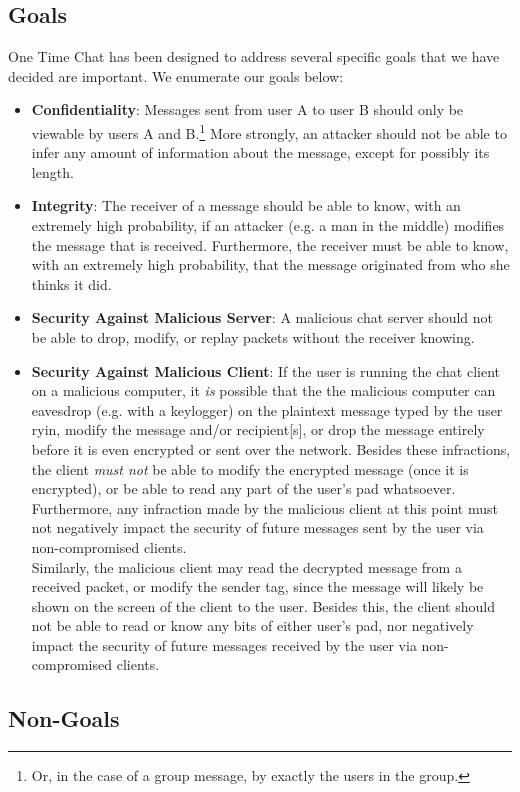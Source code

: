 \documentclass[twocolumn]{article}
\begin{document}
\subsection{Goals}
One Time Chat has been designed to address several specific goals that we have decided are important. We enumerate our goals below:
\begin{itemize}
\item \textbf{Confidentiality}: Messages sent from user A to user B should only be viewable by users A and B.\footnote{
Or, in the case of a group message, by exactly the users in the group.
}
More strongly, an attacker should not be able to infer any amount of information about the message, except for possibly its length.
\item \textbf{Integrity}: The receiver of a message should be able to know, with an extremely high probability, if an attacker (e.g. a man in the middle) modifies the message that is received. Furthermore, the receiver must be able to know, with an extremely high probability, that the message originated from who she thinks it did.
\item \textbf{Security Against Malicious Server}: A malicious chat server should not be able to drop, modify, or replay packets without the receiver knowing.
\item \textbf{Security Against Malicious Client}: If the user is running the chat client on a malicious computer, it \emph{is} possible that the the malicious computer can eavesdrop (e.g. with a keylogger) on the plaintext message typed by the user ryin, modify the message and/or recipient[s], or drop the message entirely before it is even encrypted or sent over the network. Besides these infractions, the client \emph{must not} be able to modify the encrypted message (once it is encrypted), or be able to read any part of the user's pad whatsoever. Furthermore, any infraction made by the malicious client at this point must not negatively impact the security of future messages sent by the user via non-compromised clients.\\
Similarly, the malicious client may read the decrypted message from a received packet, or modify the sender tag, since the message will likely be shown on the screen of the client to the user. Besides this, the client should not be able to read or know any bits of either user's pad, nor negatively impact the security of future messages received by the user via non-compromised clients.
\end{itemize}

\subsection{Non-Goals}
\end{document}
